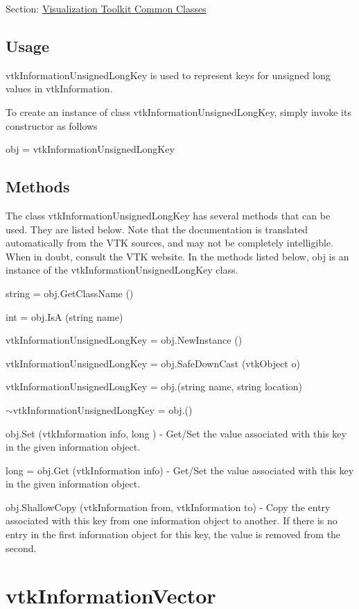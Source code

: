 Section\-: \hyperlink{sec_vtkcommon}{Visualization Toolkit Common Classes} \hypertarget{vtkwidgets_vtkxyplotwidget_Usage}{}\subsection{Usage}\label{vtkwidgets_vtkxyplotwidget_Usage}
vtk\-Information\-Unsigned\-Long\-Key is used to represent keys for unsigned long values in vtk\-Information.

To create an instance of class vtk\-Information\-Unsigned\-Long\-Key, simply invoke its constructor as follows \begin{DoxyVerb}  obj = vtkInformationUnsignedLongKey
\end{DoxyVerb}
 \hypertarget{vtkwidgets_vtkxyplotwidget_Methods}{}\subsection{Methods}\label{vtkwidgets_vtkxyplotwidget_Methods}
The class vtk\-Information\-Unsigned\-Long\-Key has several methods that can be used. They are listed below. Note that the documentation is translated automatically from the V\-T\-K sources, and may not be completely intelligible. When in doubt, consult the V\-T\-K website. In the methods listed below, {\ttfamily obj} is an instance of the vtk\-Information\-Unsigned\-Long\-Key class. 
\begin{DoxyItemize}
\item {\ttfamily string = obj.\-Get\-Class\-Name ()}  
\item {\ttfamily int = obj.\-Is\-A (string name)}  
\item {\ttfamily vtk\-Information\-Unsigned\-Long\-Key = obj.\-New\-Instance ()}  
\item {\ttfamily vtk\-Information\-Unsigned\-Long\-Key = obj.\-Safe\-Down\-Cast (vtk\-Object o)}  
\item {\ttfamily vtk\-Information\-Unsigned\-Long\-Key = obj.(string name, string location)}  
\item {\ttfamily $\sim$vtk\-Information\-Unsigned\-Long\-Key = obj.()}  
\item {\ttfamily obj.\-Set (vtk\-Information info, long )} -\/ Get/\-Set the value associated with this key in the given information object.  
\item {\ttfamily long = obj.\-Get (vtk\-Information info)} -\/ Get/\-Set the value associated with this key in the given information object.  
\item {\ttfamily obj.\-Shallow\-Copy (vtk\-Information from, vtk\-Information to)} -\/ Copy the entry associated with this key from one information object to another. If there is no entry in the first information object for this key, the value is removed from the second.  
\end{DoxyItemize}\hypertarget{vtkcommon_vtkinformationvector}{}\section{vtk\-Information\-Vector}\label{vtkcommon_vtkinformationvector}
